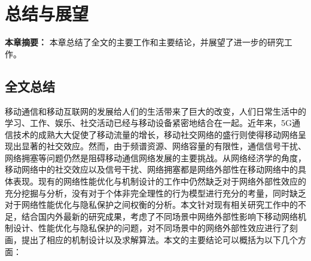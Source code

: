 \chapter{总结与展望}
\textbf{本章摘要：} 本章总结了全文的主要工作和主要结论，并展望了进一步的研究工作。

\section{全文总结}

移动通信和移动互联网的发展给人们的生活带来了巨大的改变，人们日常生活中的学习、工作、娱乐、社交活动已经与移动设备紧密地结合在一起。近年来，5G通信技术的成熟大大促使了移动流量的增长，移动社交网络的盛行则使得移动网络呈现出显著的社交效应。然而，由于频谱资源、网络容量的有限性，通信信号干扰、网络拥塞等问题仍然是阻碍移动通信网络发展的主要挑战。从网络经济学的角度，移动网络中的社交效应以及信号干扰、网络拥塞都是网络外部性在移动网络中的具体表现。现有的网络性能优化与机制设计的工作中仍然缺乏对于网络外部性效应的充分挖掘与分析，没有对于个体非完全理性的行为模型进行充分的考量，同时缺乏对于网络性能优化与隐私保护之间权衡的分析。本文针对现有相关研究工作中的不足，结合国内外最新的研究成果，考虑了不同场景中网络外部性影响下移动网络机制设计、性能优化与隐私保护的问题，对不同场景中的网络外部性效应进行了刻画，提出了相应的机制设计以及求解算法。本文的主要结论可以概括为以下几个方面：

